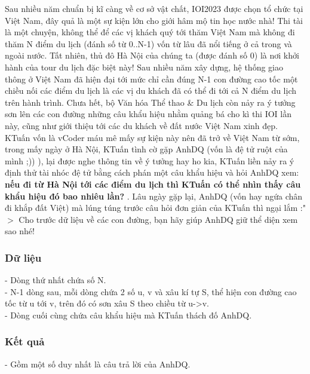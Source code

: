 







   Sau nhiều năm chuẩn bị kĩ càng về cơ sở vật chất, IOI2023 được chọn tổ chức tại Việt Nam, đây quả là một sự kiện lớn cho giới hâm mộ tin học nước nhà! Thi tài là một chuyện, không thể để các vị khách quý tới thăm Việt Nam mà không đi thăm N điểm du lịch (đánh số từ 0..N-1) vốn từ lâu đã nổi tiếng ở cả trong và ngoài nước. Tất nhiên, thủ đô Hà Nội của chúng ta (được đánh số 0) là nơi khởi hành của tour du lịch đặc biệt này! Sau nhiều năm xây dựng, hệ thống giao thông ở Việt Nam đã hiện đại tới mức chỉ cần đúng N-1 con đường cao tốc một chiều nối các điểm du lịch là các vị du khách đã có thể đi tới cả N điểm du lịch trên hành trình. Chưa hết, bộ Văn hóa Thể thao \& Du lịch còn nảy ra ý tưởng sơn lên các con đường những câu khẩu hiệu nhằm quảng bá cho kì thi IOI lần này, cũng như giới thiệu tới các du khách về đất nước Việt Nam xinh đẹp. KTuấn vốn là vCoder máu mê mấy sự kiện này nên đã trở về Việt Nam từ sớm, trong mấy ngày ở Hà Nội, KTuấn tình cờ gặp AnhDQ (vốn là đệ tử ruột của mình ;)) ), lại được nghe thông tin về ý tưởng hay ho kia, KTuấn liền nảy ra ý định thử tài nhóc đệ tử bằng cách phán một câu khẩu hiệu và hỏi AnhDQ xem:   \textbf{    nếu đi từ Hà Nội tới các điểm du lịch thì KTuấn có thể nhìn thấy câu khẩu hiệu đó bao nhiêu lần?   }   . Lâu ngày gặp lại, AnhDQ (vốn hay ngứa chân đi khắp đất Việt) mà lúng túng trước câu hỏi đơn giản của KTuấn thì ngại lắm :"$>$ Cho trước dữ liệu về các con đường, bạn hãy giúp AnhDQ giữ thể diện xem sao nhé!  

\subsubsection{   Dữ liệu  }

   - Dòng thứ nhất chứa số N.   
\\   - N-1 dòng sau, mỗi dòng chứa 2 số u, v và xâu kí tự S, thể hiện con đường cao tốc từ u tới v, trên đó có sơn xâu S theo chiều từ u->v.   
\\   - Dòng cuối cùng chứa câu khẩu hiệu mà KTuấn thách đố AnhDQ.  

\subsubsection{   Kết quả  }

   - Gồm một số duy nhất là câu trả lời của AnhDQ.  

